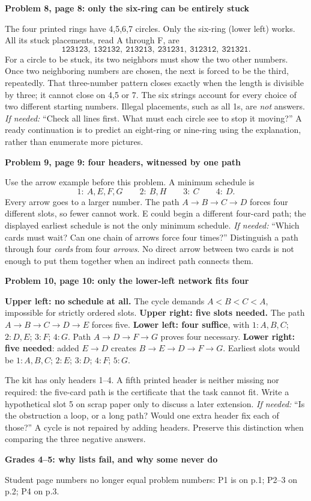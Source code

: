 \documentclass[10pt]{article}
\newcommand{\head}[1]{\par{\large\bfseries #1}\par}
\newcommand{\sub}[1]{\par\textbf{#1}\par}
\newcommand{\hint}[1]{\textit{If needed:} #1}
\newcommand{\word}[1]{\texttt{#1}}
\begin{document}
\sub{Problem 8, page 8: only the six-ring can be entirely stuck}
The four printed rings have 4,5,6,7 circles. Only the six-ring (lower left) works. All its stuck placements, read A through F, are
\[
\word{123123},\ \word{132132},\ \word{213213},\ \word{231231},\ \word{312312},\ \word{321321}.
\]
For a circle to be stuck, its two neighbors must show the two other numbers. Once two neighboring numbers are chosen, the next is forced to be the third, repeatedly. That three-number pattern closes exactly when the length is divisible by three; it cannot close on 4,5 or 7. The six strings account for every choice of two different starting numbers. Illegal placements, such as all 1s, are \emph{not} answers. \hint{``Check all lines first. What must each circle see to stop it moving?''} A ready continuation is to predict an eight-ring or nine-ring using the explanation, rather than enumerate more pictures.

\sub{Problem 9, page 9: four headers, witnessed by one path}
Use the arrow example before this problem. A minimum schedule is
\[
1:\ A,E,F,G\qquad 2:\ B,H\qquad 3:\ C\qquad 4:\ D.
\]
Every arrow goes to a larger number. The path $A\to B\to C\to D$ forces four different slots, so fewer cannot work. E could begin a different four-card path; the displayed earliest schedule is not the only minimum schedule. \hint{``Which cards must wait? Can one chain of arrows force four times?''} Distinguish a path through four \emph{cards} from four \emph{arrows}. No direct arrow between two cards is not enough to put them together when an indirect path connects them.

\sub{Problem 10, page 10: only the lower-left network fits four}
\textbf{Upper left: no schedule at all.} The cycle demands $A<B<C<A$, impossible for strictly ordered slots. \textbf{Upper right: five slots needed.} The path $A\to B\to C\to D\to E$ forces five. \textbf{Lower left: four suffice}, with $1:A,B,C$; $2:D,E$; $3:F$; $4:G$. Path $A\to D\to F\to G$ proves four necessary. \textbf{Lower right: five needed}: added $E\to D$ creates $B\to E\to D\to F\to G$. Earliest slots would be $1:A,B,C$; $2:E$; $3:D$; $4:F$; $5:G$.

The kit has only headers 1--4. A fifth printed header is neither missing nor required: the five-card path is the certificate that the task cannot fit. Write a hypothetical slot 5 on scrap paper only to discuss a later extension. \hint{``Is the obstruction a loop, or a long path? Would one extra header fix each of those?''} A cycle is not repaired by adding headers. Preserve this distinction when comparing the three negative answers.
\newpage
\head{Grades 4--5: why lists fail, and why some never do}
Student page numbers no longer equal problem numbers: P1 is on p.1; P2--3 on p.2; P4 on p.3.
\end{document}
